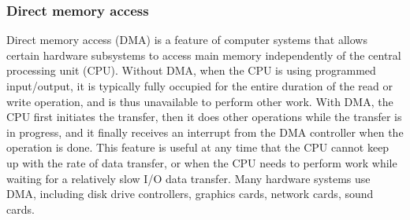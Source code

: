 \subsubsection{Direct memory access}
Direct memory access (DMA) is a feature of computer systems that allows certain hardware subsystems to access main memory independently of the central processing unit (CPU). Without DMA, when the CPU is using programmed input/output, it is typically fully occupied for the entire duration of the read or write operation, and is thus unavailable to perform other work. With DMA, the CPU first initiates the transfer, then it does other operations while the transfer is in progress, and it finally receives an interrupt from the DMA controller when the operation is done. This feature is useful at any time that the CPU cannot keep up with the rate of data transfer, or when the CPU needs to perform work while waiting for a relatively slow I/O data transfer.  Many hardware systems use DMA, including disk drive controllers, graphics cards, network cards, sound cards.